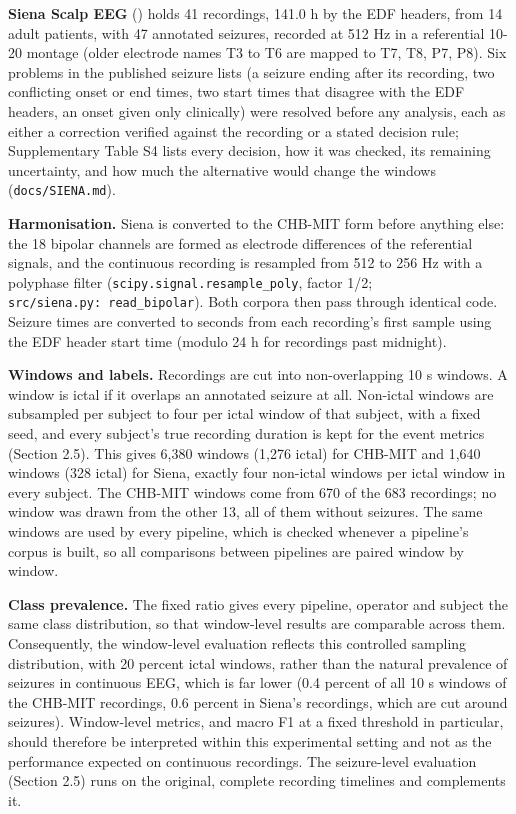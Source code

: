 \documentclass[11pt,a4paper]{article}
\begin{document}
\textbf{Siena Scalp EEG} (\citealp{Detti_2020}) holds 41 recordings, 141.0 h by the EDF
headers, from 14 adult patients, with 47 annotated seizures, recorded at 512 Hz in a
referential 10-20 montage (older electrode names T3 to T6 are mapped to T7, T8, P7,
P8). Six problems in the published seizure lists (a seizure ending after its
recording, two conflicting onset or end times, two start times that disagree with the
EDF headers, an onset given only clinically) were resolved before any analysis, each
as either a correction verified against the recording or a stated decision rule;
Supplementary Table S4 lists every decision, how it was checked, its remaining
uncertainty, and how much the alternative would change the windows (\nolinkurl{docs/SIENA.md}).

\textbf{Harmonisation.} Siena is converted to the CHB-MIT form before anything else: the
18 bipolar channels are formed as electrode differences of the referential signals,
and the continuous recording is resampled from 512 to 256 Hz with a polyphase filter
(\nolinkurl{scipy.signal.resample_poly}, factor 1/2; \texttt{src/siena.py:\ read\_bipolar}). Both
corpora then pass through identical code. Seizure times are converted to seconds from
each recording's first sample using the EDF header start time (modulo 24 h for
recordings past midnight).

\textbf{Windows and labels.} Recordings are cut into non-overlapping 10 s windows. A window
is ictal if it overlaps an annotated seizure at all. Non-ictal windows are subsampled
per subject to four per ictal window of that subject, with a fixed seed, and every
subject's true recording duration is kept for the event metrics (Section 2.5). This
gives 6,380 windows (1,276 ictal) for CHB-MIT and 1,640 windows (328 ictal) for Siena,
exactly four non-ictal windows per ictal window in every subject. The CHB-MIT windows
come from 670 of the 683 recordings; no window was drawn from the other 13, all of them
without seizures. The same windows are used by every pipeline, which is checked
whenever a pipeline's corpus is built, so all comparisons between pipelines are paired
window by window.

\textbf{Class prevalence.} The fixed ratio gives every pipeline, operator and subject the
same class distribution, so that window-level results are comparable across them.
Consequently, the window-level evaluation reflects this controlled sampling
distribution, with 20 percent ictal windows, rather than the natural prevalence of
seizures in continuous EEG, which is far lower (0.4 percent of all 10 s windows of the
CHB-MIT recordings, 0.6 percent in Siena's recordings, which are cut around seizures). Window-level metrics, and macro F1 at a fixed threshold in particular, should
therefore be interpreted within this experimental setting and not as the performance
expected on continuous recordings. The seizure-level evaluation (Section 2.5) runs on
the original, complete recording timelines and complements it.
\end{document}
